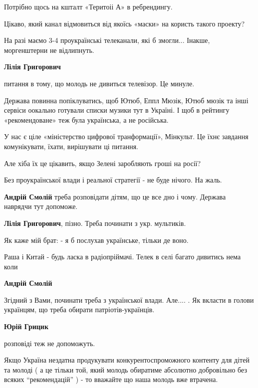 \begin{itemize}
\begin{itemize}
\end{itemize} %


Потрібно щось на кшталт «Теритоіі А» в ребрендингу.

Цікаво, який канал відмовиться від якоїсь «маски» на користь такого проекту?

На разі маємо 3-4 проукраїнські телеканали, які б змогли... Інакше,
моргенштерни не відлипнуть.

\begin{itemize} %
\textbf{Лілія Григорович} 

питання в тому, що молодь не дивиться телевізор. Це минуле.

Держава повинна попіклуватись, щоб Ютюб, Еппл Мюзік, Ютюб мюзік та інші сервіси
оокально готували списки музики тут в Україні. І щоб в рейтингу «рекомендоване»
теж була українська, а не російська.

У нас є ціле «міністерство цифрової транформації», Мінкульт. Це їхнє завдання
комунікувати, їхати, вирішувати ці питання.

Але хіба їх це цікавить, якщо Зелені заробляють гроші на росії?

Без проукраїнської влади і реальної стратегії - не буде нічого. На жаль.


\textbf{Андрій Смолій} треба розповідати дітям, що це все дно і чому. Держава наврядчи тут допоможе.

\textbf{Лілія Григорович}, пізно. Треба починати з укр. мультиків.


Як каже мій брат: - я б послухав українське, тільки де воно.

Раша і Китай - будь ласка в радіопріймачі. Телек в селі багато дивитись нема
коли

\textbf{Андрій Смолій}

Згідний з Вами, починати треба з української влади. Але.... . Як вкласти в
голови українцям, що треба обирати патріотів-українців.

\textbf{Юрій Грицик} 

розповіді теж не допоможуть.

Якщо Україна нездатна продукувати конкурентоспроможного контенту для дітей та
молоді ( а це тільки той, який молодь обиратиме абсолютно добровільно без всяких
\enquote{рекомендацій} ) - то вважайте що наша молодь вже втрачена.


\end{itemize}
\end{itemize}
